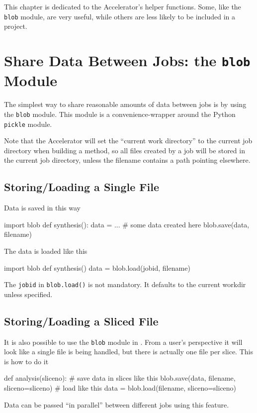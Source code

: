 
This chapter is dedicated to the Accelerator's helper functions.
Some, like the \texttt{blob} module, are very useful, while others are
less likely to be included in a project.

\section{Share Data Between Jobs:  the \texttt{blob} Module}

The simplest way to share reasonable amounts of data between jobs is
by using the \texttt{blob} module.  This module is a
convenience-wrapper around the Python \texttt{pickle} module.

Note that the Accelerator will set the ``current work directory'' to
the current job directory when building a method, so all files created
by a job will be stored in the current job directory, unless the
filename contains a path pointing elsewhere.

\subsection*{Storing/Loading a  Single File}
Data is saved in this way
\begin{python}
import blob
def synthesis():
    data = ...  # some data created here
    blob.save(data, filename)
\end{python}
The data is loaded like this
\begin{python}
import blob
def synthesis()
    data = blob.load(jobid, filename)
\end{python}
The \texttt{jobid} in \texttt{blob.load()} is not mandatory.  It
defaults to the current workdir unless specified.



\subsection{Storing/Loading a Sliced File}
It is also possible to use the \texttt{blob} module in \analysis.
From a user's perspective it will look like a single file is being
handled, but there is actually one file per slice.  This is how to do
it
\begin{python}
def analysis(sliceno):
    # save data in slices like this
    blob.save(data, filename, sliceno=sliceno)
    # load like this
    data = blob.load(filename, sliceno=sliceno)
\end{python}

Data can be passed ``in parallel'' between different jobs using this
feature.



